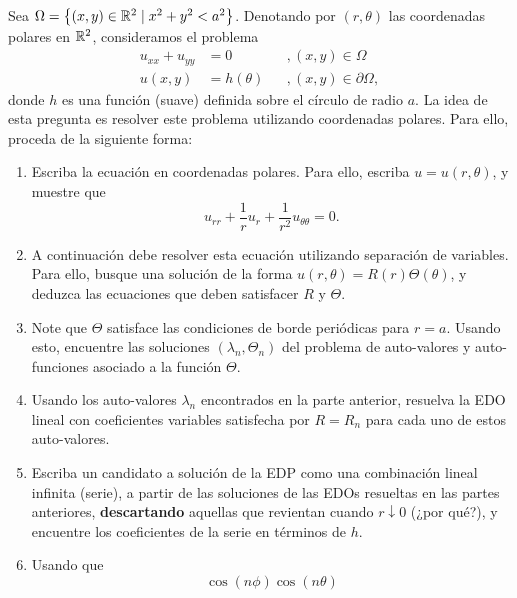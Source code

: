 \begin{Problema}
	Sea \(\Omega = \left\{ (x,y) \in \mathbb{R}^2 \mid x^2 + y^2 < a^2
	\right\}\). Denotando por \((r,\theta)\) las coordenadas polares
	en \(\mathbb{R}^2\), consideramos el problema
	\begin{displaymath}
	\begin{aligned}
		u_{xx} + u_{yy} &= 0 &&, (x,y) \in \Omega\\
		u(x,y) &= h(\theta) &&, (x,y) \in \partial\Omega, 
	\end{aligned}
	\end{displaymath}
	donde \(h\) es una función (suave) definida sobre el círculo de
	radio \(a\). La idea de esta pregunta es resolver este problema
	utilizando coordenadas polares. Para ello, proceda de la siguiente
	forma:
	\begin{enumerate}[label=(\alph*), topsep=3pt, itemsep=2pt]
		\item Escriba la ecuación en coordenadas polares. Para ello,
			escriba \(u = u(r,\theta)\), y muestre que 
			\begin{displaymath}
				u_{rr} + \frac{1}{r} u_{r} 
				+ \frac{1}{r^2} u_{\theta\theta} 
				= 0.
			\end{displaymath}
		\item A continuación debe resolver esta ecuación utilizando
			separación de variables. Para ello, busque una solución de
			la forma \(u(r,\theta) = R(r) \Theta(\theta)\), y deduzca
			las ecuaciones que deben satisfacer \(R\) y \(\Theta\).
		\item Note que \(\Theta\) satisface las condiciones de borde
			periódicas para \(r=a\). Usando esto, encuentre las
			soluciones \((\lambda_n, \Theta_n)\) del problema de
			auto-valores y auto-funciones asociado a la función
			\(\Theta\).
		\item Usando los auto-valores \(\lambda_n\) encontrados en la
			parte anterior, resuelva la EDO lineal con coeficientes
			variables satisfecha por \(R = R_{n}\) para cada uno de
			estos auto-valores.
		\item Escriba un candidato a solución de la EDP como una
			combinación lineal infinita (serie), a partir de las
			soluciones de las EDOs resueltas en las partes anteriores,
			\textbf{descartando} aquellas que revientan cuando \(r
			\downarrow 0\) (¿por qué?), y encuentre los coeficientes
			de la serie en términos de \(h\).
		\item Usando que
			\begin{displaymath}
				\cos(n\phi) \cos(n\theta)

\end{displaymath}
\end{enumerate}
\end{Problema}
